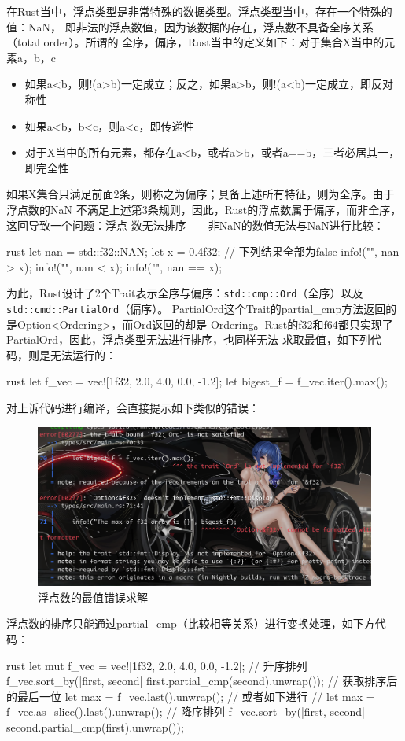 在Rust当中，浮点类型是非常特殊的数据类型。浮点类型当中，存在一个特殊的值：NaN，
即非法的浮点数值，因为该数据的存在，浮点数不具备全序关系（total order）。所谓的
全序，偏序，Rust当中的定义如下：对于集合X当中的元素a，b，c
\begin{itemize}
  \item 如果a<b，则!(a>b)一定成立；反之，如果a>b，则!(a<b)一定成立，即反对称性
  \item 如果a<b，b<c，则a<c，即传递性
  \item 对于X当中的所有元素，都存在a<b，或者a>b，或者a==b，三者必居其一，即完全性
\end{itemize}
如果X集合只满足前面2条，则称之为偏序；具备上述所有特征，则为全序。由于浮点数的NaN
不满足上述第3条规则，因此，Rust的浮点数属于偏序，而非全序，这回导致一个问题：浮点
数无法排序——非NaN的数值无法与NaN进行比较：
\begin{code-block}{rust}
let nan = std::f32::NAN;
let x = 0.4f32;
// 下列结果全部为false
info!("{}", nan > x);
info!("{}", nan < x);
info!("{}", nan == x);
\end{code-block}
为此，Rust设计了2个Trait表示全序与偏序：\texttt{std::cmp::Ord}（全序）以及
\texttt{std::cmd::PartialOrd}（偏序）。
PartialOrd这个Trait的partial\_cmp方法返回的是Option<Ordering>，而Ord返回的却是
Ordering。Rust的f32和f64都只实现了PartialOrd，因此，浮点类型无法进行排序，也同样无法
求取最值，如下列代码，则是无法运行的：
\begin{code-block}{rust}
let f_vec = vec![1f32, 2.0, 4.0, 0.0, -1.2];
let bigest_f = f_vec.iter().max();
\end{code-block}
对上诉代码进行编译，会直接提示如下类似的错误：
\begin{figure}[H]
  \centering
  \includegraphics[scale=0.2]{rust_float_cmp_error.png}
  \caption{浮点数的最值错误求解}
  \label{fig:rust_float_cmp_error}
\end{figure}
浮点数的排序只能通过partial\_cmp（比较相等关系）进行变换处理，如下方代码：
\begin{code-block}{rust}
let mut f_vec = vec![1f32, 2.0, 4.0, 0.0, -1.2];
// 升序排列
f_vec.sort_by(|first, second| first.partial_cmp(second).unwrap());
// 获取排序后的最后一位
let max = f_vec.last().unwrap();
// 或者如下进行
// let max = f_vec.as_slice().last().unwrap();
// 降序排列
f_vec.sort_by(|first, second| second.partial_cmp(first).unwrap());
\end{code-block}

